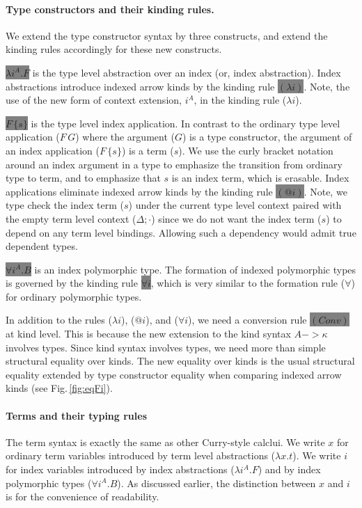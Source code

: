 \documentclass{llncs}
\newcommand{\Fig}[1]{Fig.\,\ref{fig:#1}}
\newcommand{\newFi}[1]{\colorbox{grey}{\ensuremath{#1}}}
\begin{document}
\paragraph{Type constructors and their kinding rules.}
We extend the type constructor syntax by three constructs,
and extend the kinding rules accordingly for these new constructs.

\newFi{\lambda i^A.F} is the type level abstraction over an index
(or, index abstraction). Index abstractions introduce indexed arrow kinds
by the kinding rule \newFi{(\lambda i)}. Note, the use of the new form of context
extension, $i^A$, in the kinding rule ($\lambda i$).


\newFi{F\,\{s\}} is the type level index application. In contrast to
the ordinary type level application ($F\,G$) where the argument ($G$) is
a type constructor, the argument of an index application ($F\,\{s\}$) is
a term ($s$). We use the curly bracket notation around an index argument in a type to
emphasize the transition from ordinary type to term, and to emphasize
that $s$ is an index term, which is erasable. Index applications eliminate
indexed arrow kinds by the kinding rule \newFi{(@i)}. Note, we type check
the index term ($s$) under the current type level context paired with
the empty term level context ($\Delta;\cdot$) since we do not want
the index term ($s$) to depend on any term level bindings. Allowing such
a dependency would admit true dependent types.

\newFi{\forall i^A . B} is an index polymorphic type.
The formation of indexed polymorphic types is governed by
the kinding rule \newFi{\forall i}, which is very similar to
the formation rule ($\forall$) for ordinary polymorphic types.

In addition to the rules ($\lambda i$), ($@ i$), and ($\forall i$),
we need a conversion rule \newFi{(Conv)} at kind level. This is because
the new extension to the kind syntax $A -> \kappa$ involves types.
Since kind syntax involves types, we need more than simple structural
equality over kinds. The new equality over kinds is the usual structural equality
extended by type constructor equality when comparing indexed arrow kinds
(see \Fig{eqFi}).

\paragraph{Terms and their typing rules}
The term syntax is exactly the same as other Curry-style calclui.
We write $x$ for ordinary term variables introduced by
term level abstractions ($\lambda x.t$).
We write $i$ for index variables introduced by
index abstractions ($\lambda i^A.F$) and by
index polymorphic types ($\forall i^A.B$). As discussed earlier, the distinction between
$x$ and $i$ is for the convenience of readability.
\end{document}
